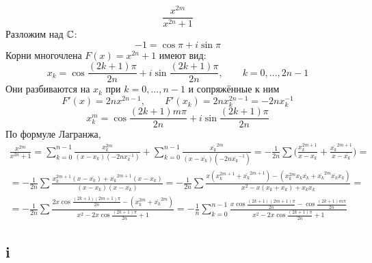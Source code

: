 $$ \frac{x^{2m}}{x^{2n} + 1} $$
Разложим над $ \mathbb{C} $:
$$ -1 = \cos \pi + i \sin \pi $$
Корни многочлена $ F(x) = x^{2n} + 1 $ имеют вид:
$$ x_k = \cos \frac{(2k + 1)\pi}{2n} + i \sin \frac{(2k + 1)\pi}{2n}, \qquad k = 0, ..., 2n - 1 $$
Они разбиваются на $ x_k $ при $ k = 0, ..., n - 1 $ и сопряжённые к ним
$$ F'(x) = 2nx^{2n - 1}, \qquad F'(x_k) = 2nx_k^{2n - 1} = -2nx_k^{-1} $$
$$ x_k^m = \cos \frac{(2k + 1)m\pi}{2n} + i \sin \frac{(2k + 1)\pi}{2n} $$
По формуле Лагранжа,
\begin{multline*}
    \frac{x^{2m}}{x^{2n} + 1} = \sum_{k = 0}^{n - 1} \frac{x_k^{2m}}{(x - x_k)(-2nx_k^{-1})} + \sum_{k = 0}^{n - 1} \frac{\overline{x_k}^{2m}}{(x - \overline{x_k})(-2n\overline{x_k}^{-1})} = -\frac1{2n} \sum \bigg( \frac{x_k^{2m + 1}}{x - x_k} + \frac{\overline{x_k}^{2m + 1}}{x - \overline{x_k}} \bigg) = \\
    = -\frac1{2n} \sum \frac{x_k^{2m + 1}(x - \overline{x_k}) + \overline{x_k}^{2m + 1}(x - x_k)}{(x - x_k)(x - \overline{x_k})} = -\frac1{2n} \sum \frac{x(x_k^{2m + 1} + \overline{x_k}^{2m + 1}) - (x_k^{2m}x_k\overline{x_k} + \overline{x_k}^{2m}\overline{x_k}x_k)}{x^2 - x(x_k + \overline{x_k}) + x_k\overline{x_k}} = \\
    = -\frac1{2n} \sum \frac{2x\cos \frac{(2k + 1)(2m + 1)\pi}{2n} - (x_k^{2m} + \overline{x_k}^{2m})}{x^2 - 2x\cos \frac{(2k + 1)\pi}{2n} + 1} = -\frac1{n} \sum_{k = 0}^{n - 1} \frac{x\cos \frac{(2k + 1)(2m + 1)\pi}{2n} - \cos \frac{(2k + 1)m\pi}{2n}}{x^2 - 2x\cos \frac{(2k + 1)\pi}{2n} + 1}
\end{multline*}

\subsection{i}

